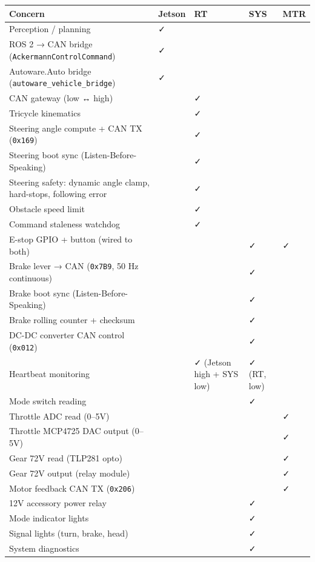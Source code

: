 \documentclass[12pt,a4paper,oneside]{report}
\begin{document}
\begin{longtable}[]{@{}lllll@{}}
\toprule\noalign{}
Concern & Jetson & RT & SYS & MTR \\
\midrule\noalign{}
\endhead
\bottomrule\noalign{}
\endlastfoot
Perception / planning & ✓ & & & \\
ROS 2 → CAN bridge (\texttt{AckermannControlCommand}) & ✓ & & & \\
Autoware.Auto bridge (\texttt{autoware\_vehicle\_bridge}) & ✓ & & & \\
CAN gateway (low ↔ high) & & ✓ & & \\
Tricycle kinematics & & ✓ & & \\
Steering angle compute + CAN TX (\texttt{0x169}) & & ✓ & & \\
Steering boot sync (Listen-Before-Speaking) & & ✓ & & \\
Steering safety: dynamic angle clamp, hard-stops, following error & & ✓ & & \\
Obstacle speed limit & & ✓ & & \\
Command staleness watchdog & & ✓ & & \\
E-stop GPIO + button (wired to both) & & & ✓ & ✓ \\
Brake lever → CAN (\texttt{0x7B9}, 50 Hz continuous) & & & ✓ & \\
Brake boot sync (Listen-Before-Speaking) & & & ✓ & \\
Brake rolling counter + checksum & & & ✓ & \\
DC-DC converter CAN control (\texttt{0x012}) & & & ✓ & \\
Heartbeat monitoring & & ✓ (Jetson high + SYS low) & ✓ (RT, low) & \\
Mode switch reading & & & ✓ & \\
Throttle ADC read (0--5V) & & & & ✓ \\
Throttle MCP4725 DAC output (0--5V) & & & & ✓ \\
Gear 72V read (TLP281 opto) & & & & ✓ \\
Gear 72V output (relay module) & & & & ✓ \\
Motor feedback CAN TX (\texttt{0x206}) & & & & ✓ \\
12V accessory power relay & & & ✓ & \\
Mode indicator lights & & & ✓ & \\
Signal lights (turn, brake, head) & & & ✓ & \\
System diagnostics & & & ✓ & \\
\end{longtable}
\end{document}
